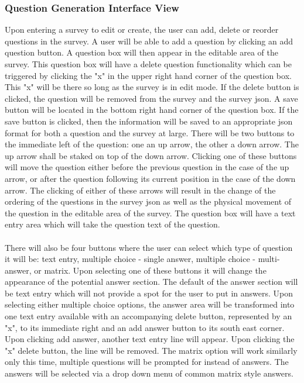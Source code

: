 \documentclass[letterpaper,10pt,serif, draftclsnofoot,onecolumn, compsoc, titlepage]{IEEEtran}
\begin{document}
\subsubsection{Question Generation Interface View}
Upon entering a survey to edit or create, the user can add, delete or reorder questions in the survey. A user will be able to add a 
question by clicking an add question button. A question box will then appear in the editable area of the survey. This question box will 
have a delete question functionality which can be triggered by clicking the "x" in the upper right hand corner of the question box. This
"x" will be there so long as the survey is in edit mode.  If the delete button is clicked, the question will be removed from the survey and the survey json. A save button will be located in the bottom right hand corner of the question box. If the save button is clicked, then the information will be saved to an appropriate json format for both a question and the survey at 
large. There will be two buttons to the immediate left of the question: one an up arrow, the other a down arrow. The up arrow
shall be staked on top of the down arrow. Clicking one of these buttons will move the question either before the previous question
 in the case of the up arrow, or after the question following its current position in the case of the down arrow. The clicking of either 
of these arrows will result in the change of the ordering of the questions in the survey json as well as the physical movement of the 
question in the editable area of the survey. The question box will have a text entry area which will take the question text of 
the question. \\ \\
There will also be four buttons where the user can select which type of question it will be: text entry, multiple choice - 
single answer, multiple choice - multi-answer, or matrix. Upon selecting one of these buttons it will change the appearance of the 
potential answer section. The default of the answer section will be text entry which will not provide a spot for the user to put in answers. 
Upon selecting either multiple choice options, the answer area will be transformed into one text entry available with an accompanying 
delete button, represented by an "x", to its immediate right and an add answer button to its south east corner. Upon clicking add 
answer, another text entry line will appear. Upon clicking the "x" delete button, the line will be removed. The matrix option will work similarly only this time, multiple questions will be prompted for instead of answers. The answers will be selected via a drop down menu
 of common matrix style answers. \\ \\
\end{document}
